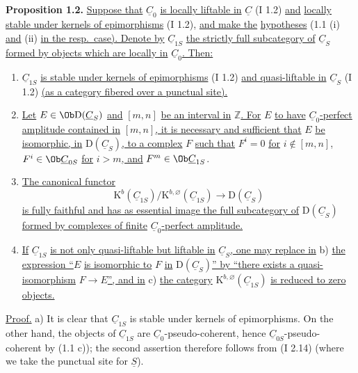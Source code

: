 \textbf{Proposition 1.2.} \uline{Suppose that} $\underline{C}_0$ \uline{is locally liftable in} $\underline{C}$ (I 1.2) \uline{and} \uline{locally stable under kernels of epimorphisms} (I 1.2), \uline{and make the}
%
\uline{hypotheses} (1.1 (i) \uline{and} (ii)
\uline{in the resp.\ case). Denote by} $\underline{C}_{1S}$ \uline{the strictly full subcategory of} $\underline{C}_S$ \uline{formed by objects which are locally in} $\underline{C}_0$\uline{. Then:}
\begin{enumerate}[label=\alph*)]
\item $\underline{C}_{1S}$ \uline{is stable under kernels of epimorphisms} (I 1.2) \uline{and quasi-liftable in} $\underline{C}_S$ (I 1.2) \uline{(as a category fibered over a punctual site).}
\item \uline{Let} $E\in\Ob\mathrm D(\underline{C}_S)$ \uline{and} $[m,n]$ \uline{be an interval in} $\mathbb Z$\uline{. For} $E$ \uline{to have} $\underline{C}_0$\uline{-perfect amplitude contained in} $[m,n]$\uline{, it is necessary and sufficient that} $E$ \uline{be isomorphic, in} $\mathrm D(\underline{C}_S)$\uline{, to a complex} $F$ \uline{such that} $F^i=0$ \uline{for} $i\notin[m,n]$, $F^i\in\Ob\underline{C}_{0S}$ \uline{for} $i>m$\uline{, and} $F^m\in\Ob\underline{C}_{1S}$.
\item \uline{The canonical functor}
\[
\mathrm K^b(\underline{C}_{1S})/\mathrm K^{b,\varnothing}(\underline{C}_{1S})
\longrightarrow \mathrm D(\underline{C}_S)
\]
\uline{is fully faithful and has as essential image the full subcategory of} $\mathrm D(\underline{C}_S)$ \uline{formed by complexes of finite} $\underline{C}_0$\uline{-perfect amplitude.}
\item \uline{If} $\underline{C}_{1S}$ \uline{is not only quasi-liftable but liftable in} $\underline{C}_S$\uline{, one may replace in} b) \uline{the expression \textquotedblleft}$E$ \uline{is isomorphic to} $F$ \uline{in} $\mathrm D(\underline{C}_S)$\uline{\textquotedblright{} by \textquotedblleft{}there exists a quasi-isomorphism} $F\to E$\uline{\textquotedblright, and in} c) \uline{the category} $\mathrm K^{b,\varnothing}(\underline{C}_{1S})$ \uline{is reduced to zero objects.}
\end{enumerate}

\uline{Proof.} a) It is clear that $\underline{C}_{1S}$ is stable under kernels of epimorphisms. On the other hand, the objects of $\underline{C}_{1S}$ are $\underline{C}_0$-pseudo-coherent, hence $\underline{C}_{0S}$-pseudo-coherent by (1.1 c)); the second assertion therefore follows from (I 2.14) (where we take the punctual site for $\underline{S}$).

